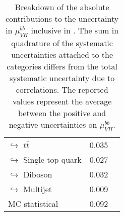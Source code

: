 \begin{table}[tbp]
\begin{center}
\begin{tabular}{ l | l  c c }
        \multicolumn{2}{l}{$\hookrightarrow$ $t\bar{t}$} & 0.035 \\
        \multicolumn{2}{l}{$\hookrightarrow$ Single top quark} & 0.027 \\
        \multicolumn{2}{l}{$\hookrightarrow$ Diboson} & 0.032 \\
        \multicolumn{2}{l}{$\hookrightarrow$ Multijet} & 0.009 \\
        \midrule
        \multicolumn{2}{l}{MC statistical} & 0.092 \\
        \hline\bottomrule
    \end{tabular}
    \end{center}
    \caption{
        Breakdown of the absolute contributions to the uncertainty in $\mu_{VH}^{bb}$ inclusive in \pTV. 
        The sum in quadrature of the systematic uncertainties attached to the categories differs from the total systematic uncertainty due to correlations. 
        The reported values represent the average between the positive and negative uncertainties on $\mu_{VH}^{bb}$.
    }
    \label{tab:mu_syst_unc}
\end{table}
    